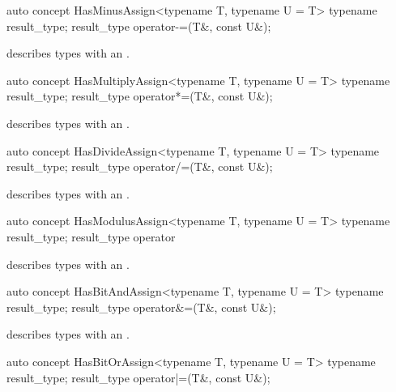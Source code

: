 \documentclass[american,twoside]{book}
\begin{document}
\begin{itemdecl}
auto concept HasMinusAssign<typename T, typename U = T> {
  typename result_type;
  result_type operator-=(T&, const U&);
}
\end{itemdecl}

\begin{itemdescr}
\pnum
\mbox{\reallynote} describes types with an \mbox{}.
\end{itemdescr}

\begin{itemdecl}
auto concept HasMultiplyAssign<typename T, typename U = T> {
  typename result_type;
  result_type operator*=(T&, const U&);
}
\end{itemdecl}

\begin{itemdescr}
\pnum
\mbox{\reallynote} describes types with an \mbox{}.
\end{itemdescr}

\begin{itemdecl}
auto concept HasDivideAssign<typename T, typename U = T> {
  typename result_type;
  result_type operator/=(T&, const U&);
}
\end{itemdecl}

\begin{itemdescr}
\pnum
\mbox{\reallynote} describes types with an \mbox{}.
\end{itemdescr}

\begin{itemdecl}
auto concept HasModulusAssign<typename T, typename U = T> {
  typename result_type;
  result_type operator%
}
\end{itemdecl}

\begin{itemdescr}
\pnum
\mbox{\reallynote} describes types with an \mbox{}.
\end{itemdescr}

\begin{itemdecl}
auto concept HasBitAndAssign<typename T, typename U = T> {
  typename result_type;
  result_type operator&=(T&, const U&);
}
\end{itemdecl}

\begin{itemdescr}
\pnum
\mbox{\reallynote} describes types with an \mbox{}.
\end{itemdescr}

\begin{itemdecl}
auto concept HasBitOrAssign<typename T, typename U = T> {
  typename result_type;
  result_type operator|=(T&, const U&);
}
\end{itemdecl}
\end{document}
